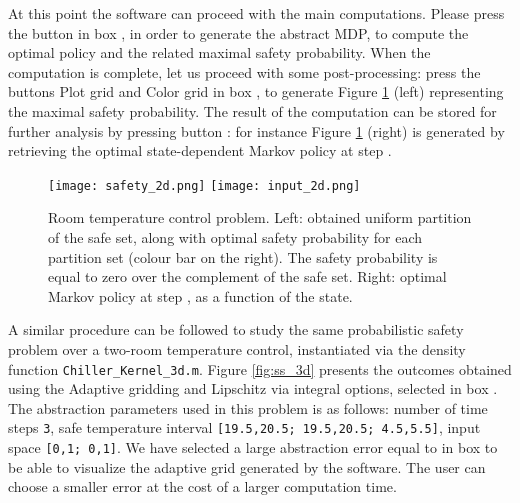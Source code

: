 \documentclass{llncs}
\newcommand*\circled[1]{\tikz[baseline=(char.base)]{\node[shape=circle,draw,inner sep=0.5pt] (char) {#1};}}
\newcommand*\circledb[1]{\tikz[baseline=(char.base)]{\node[shape=circle,draw,inner sep=0.2pt] (char) {#1};}}
\newcommand{\boxname}[1]{\textsf{#1}}
\begin{document}
At this point the software can proceed with the main computations. 
Please press the button in box \circled{6}, 
in order to generate the abstract MDP, to compute the optimal policy and the related maximal safety probability. 
When the computation is complete, 
let us proceed with some post-processing: 
press the buttons \boxname{Plot grid} and \boxname{Color grid} in box \circledb{13}, 
to generate Figure \ref{fig:ss_2d} (left) representing the maximal safety probability. 
The result of the computation can be stored for further analysis by pressing button \circledb{12}: 
for instance Figure \ref{fig:ss_2d} (right) is generated by retrieving the optimal state-dependent Markov policy at step .

\begin{figure}
\begin{center}
\texttt{[image: safety\_2d.png]}
\texttt{[image: input\_2d.png]}
\caption{Room temperature control problem. 
Left: obtained uniform partition of the safe set, along with optimal safety probability for each partition set (colour bar on the right).  
The safety probability is equal to zero over the complement of the safe set. 
Right: optimal Markov policy at step , as a function of the state.}
\label{fig:ss_2d}
\end{center}
\end{figure}

A similar procedure can be followed to study the same probabilistic safety problem over a two-room temperature control, 
instantiated via the density function \texttt{Chiller\_Kernel\_3d.m}.  
Figure \ref{fig:ss_3d} presents the outcomes obtained using the \boxname{Adaptive gridding} and \boxname{Lipschitz via integral} options,
selected in box \circled{4}. The abstraction parameters used in this problem is as follows:
number of time steps \texttt{3},
safe temperature interval \texttt{[19.5,20.5; 19.5,20.5; 4.5,5.5]},
input space \texttt{[0,1; 0,1]}.
We have selected a large abstraction error equal to  in box \circled{5} to be able to visualize the adaptive grid generated by the software. 
The user can choose a smaller error at the cost of a larger computation time. 
\end{document}

